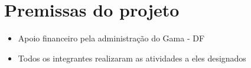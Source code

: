 \section{Premissas do projeto}

    \begin{itemize}
      \item Apoio financeiro pela administração do Gama - DF
      \item Todos os integrantes realizaram as atividades a eles designados
    \end{itemize}
